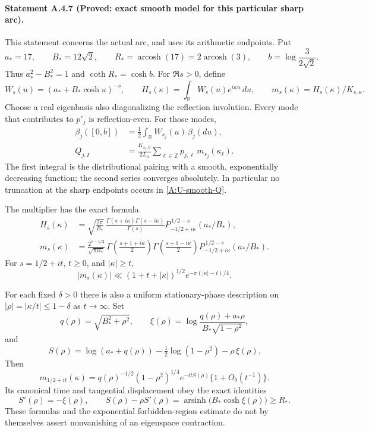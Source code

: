 \paragraph{Statement A.4.7 (Proved: exact smooth model for this particular sharp arc).}
This statement concerns the actual arc, and uses its arithmetic endpoints.
Put
\[
 a_*=17,\qquad B_*=12\sqrt2,\qquad
 R_*=\operatorname{arcosh}(17)=2\operatorname{arcosh}(3),
 \qquad b=\log\frac3{2\sqrt2}.
\]
Thus $a_*^2-B_*^2=1$ and $\coth R_*=\cosh b$.
For $\Re s>0$, define
\[
 W_s(u)=(a_*+B_*\cosh u)^{-s},\qquad
 H_s(\kappa)=\int_{\mathbb R}W_s(u)e^{i\kappa u}\,du,
 \qquad m_s(\kappa)=H_s(\kappa)/K_{s,\kappa}.
\]
Choose a real eigenbasis also diagonalizing the reflection involution.
Every mode that contributes to $p'_j$ is reflection-even. For those modes,
\begin{align}\label{A:U-smooth-boundary}
 \beta_j([0,b])
 &=\frac12\int_{\mathbb R}W_{s_j}(u)\,\beta_j(du),\\
 Q_{j,I}
 &=\frac{K_{s_j,0}}{2L_0}
       \sum_{\ell\in\mathbb Z}p_{j,\ell}\,
                    m_{s_j}(\kappa_\ell).
 \label{A:U-smooth-Q}
\end{align}
The first integral is the distributional pairing with a smooth,
exponentially decreasing function; the second series converges absolutely.
In particular no truncation at the sharp endpoints occurs in
\eqref{A:U-smooth-Q}.

The multiplier has the exact formula
\begin{align}\label{A:U-Legendre-multiplier}
 H_s(\kappa)
 &=\sqrt{\frac{2\pi}{B_*}}\,
   \frac{\Gamma(s+i\kappa)\Gamma(s-i\kappa)}{\Gamma(s)}
   P_{-1/2+i\kappa}^{\,1/2-s}(a_*/B_*),\\
 m_s(\kappa)
 &=\frac{2^{s-1/2}}{\sqrt{\pi B_*}}\,
   \Gamma\!\left(\frac{s+1+i\kappa}{2}\right)
   \Gamma\!\left(\frac{s+1-i\kappa}{2}\right)
   P_{-1/2+i\kappa}^{\,1/2-s}(a_*/B_*).
 \nonumber
\end{align}
For $s=1/2+it$, $t\geq0$, and $|\kappa|\geq t$,
\begin{equation}\label{A:U-forbidden-exponential}
 |m_s(\kappa)|\ll
 (1+t+|\kappa|)^{1/2}
       e^{-\pi(|\kappa|-t)/4}.
\end{equation}

For each fixed $\delta>0$ there is also a uniform stationary-phase
description on $|\rho|=|\kappa/t|\leq1-\delta$ as $t\to\infty$.
Set
\[
 q(\rho)=\sqrt{B_*^2+\rho^2},\qquad
 \xi(\rho)=
 \log\frac{q(\rho)+a_*\rho}{B_*\sqrt{1-\rho^2}},
\]
and
\[
 S(\rho)=\log(a_*+q(\rho))
       -\tfrac12\log(1-\rho^2)-\rho\,\xi(\rho).
\]
Then
\begin{equation}\label{A:U-stationary-multiplier}
 m_{1/2+it}(\kappa)
 =q(\rho)^{-1/2}(1-\rho^2)^{1/4}
       e^{-itS(\rho)}\{1+O_\delta(t^{-1})\}.
\end{equation}
Its canonical time and tangential displacement obey the exact identities
\begin{equation}\label{A:U-canonical-time}
 S'(\rho)=-\xi(\rho),\qquad
 S(\rho)-\rho S'(\rho)
   =\operatorname{arsinh}\!\bigl(B_*\cosh\xi(\rho)\bigr)
   \geq R_*.
\end{equation}
These formulas and the exponential forbidden-region estimate do not by
themselves assert nonvanishing of an eigenspace contraction.

